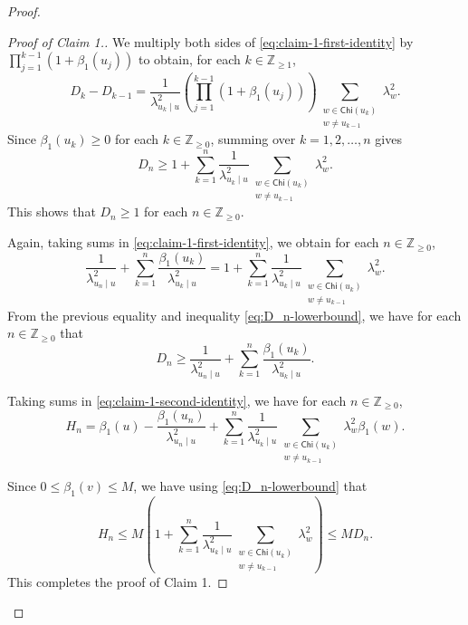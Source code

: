 \documentclass[11pt, reqno, a4paper]{amsart}
\theoremstyle{definition}
\renewcommand{\le}{\leqslant}
\renewcommand{\ge}{\geqslant}
\newcommand{\Z}{\mathbb Z}
\newcommand{\Chi}{\mathsf{Chi}}
\numberwithin{equation}{section}
\begin{document}
\begin{proof}
\begin{proof}[Proof of Claim 1.]
    We multiply both sides of \eqref{eq:claim-1-first-identity} by $\prod_{j=1}^{k-1}(1+\beta_1(u_j))$ to obtain, for each $k\in\Z_{\ge1}$,
    \begin{equation*}
        D_k-D_{k-1}
        =\frac{1}{\lambda_{u_k\mid u}^2}
        \left(\prod_{j=1}^{k-1}(1+\beta_1(u_j))\right)
        \sum_{\substack{w\in\Chi(u_k)\\w\ne u_{k-1}}}\lambda_w^2.
    \end{equation*}
    Since $\beta_1 (u_k) \ge 0$ for each $k \in \Z_{\ge 0}$, summing over $k=1,2, \ldots, n$ gives
    \begin{equation}
        D_n \ge 1 + \sum_{k=1}^n  \frac{1}{\lambda_{u_k \mid u} ^{2}} \sum_{\substack{w \in \Chi (u_k) \\ w \ne u_{k-1}}} \lambda_{w} ^{2}.
        \label{eq:D_n-lowerbound}
    \end{equation}
    This shows that $D_n \ge 1$ for each $n \in \Z_{\ge 0}$.

    Again, taking sums in \eqref{eq:claim-1-first-identity}, we obtain for each $n \in \Z_{\ge 0}$,
    \begin{equation*}
        \frac{1}{\lambda_{u_n\mid u}^2} + \sum_{k=1}^n \frac{\beta_1(u_k)}{\lambda_{u_k\mid u}^2} = 1+ \sum_{k=1}^n \frac{1}{\lambda_{u_k\mid u}^2} \sum_{\substack{w \in \Chi (u_k) \\ w \ne u_{k-1}}}\lambda_w^2.
    \end{equation*}
    From the previous equality and inequality \eqref{eq:D_n-lowerbound}, we have for each $n \in \Z_{\ge 0}$ that
    \begin{equation*}
        D_n \ge \frac{1}{\lambda_{u_n \mid u} ^{2}} + \sum_{k=1}^{n} \frac{\beta_1 (u_k)}{\lambda_{u_k \mid u} ^{2}}.
    \end{equation*}

    Taking sums in \eqref{eq:claim-1-second-identity}, we have for each $n \in \Z_{\ge 0}$,
    \begin{equation*}
        H_n = \beta_1(u) - \frac{\beta_1(u_n)}{\lambda_{u_n\mid u}^2}+ \sum_{k=1}^n \frac{1}{\lambda_{u_k\mid u}^2} \sum_{\substack{w \in \Chi(u_k) \\ w\ne u_{k-1}}} \lambda_w^2\beta_1(w).
    \end{equation*}

    Since $0 \le \beta_1 (v) \le M$, we have using \eqref{eq:D_n-lowerbound} that 
    \begin{equation*}
        H_n \le M \left( 1+ \sum_{k=1}^n \frac{1}{\lambda_{u_k\mid u}^2} \sum_{\substack{w \in \Chi(u_k) \\ w\ne u_{k-1}}}\lambda_w^2 \right) \le MD_n.
    \end{equation*}
    This completes the proof of Claim 1.
\end{proof}


\end{proof}
\end{document}
